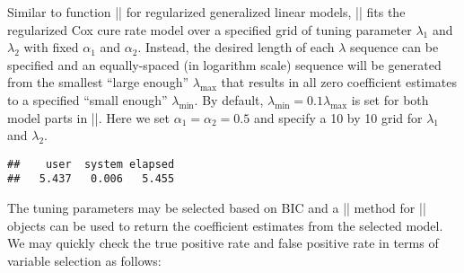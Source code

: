Similar to function
\VERB|\OperatorTok{::}\NormalTok{()}|
for regularized generalized linear models,
\VERB|\NormalTok{()}| fits the
regularized Cox cure rate model over a specified grid of tuning
parameter \(\lambda_1\) and \(\lambda_2\) with fixed \(\alpha_1\) and
\(\alpha_2\). Instead, the desired length of each \(\lambda\) sequence
can be specified and an equally-spaced (in logarithm scale) sequence
will be generated from the smallest ``large enough'' \(\lambda_{\max}\)
that results in all zero coefficient estimates to a specified ``small
enough'' \(\lambda_{\min}\). By default,
\(\lambda_{\min}=0.1\lambda_{\max}\) is set for both model parts in
\VERB|\NormalTok{()}|. Here we set
\(\alpha_1 = \alpha_2 = 0.5\) and specify a 10 by 10 grid for
\(\lambda_1\) and \(\lambda_2\).

\begin{Shaded}
\begin{Highlighting}[]
\NormalTok{(\{}
\StringTok{ }\NormalTok{(}
        \OperatorTok{$}\OperatorTok{$}
         \NormalTok{, } \NormalTok{,}
         \NormalTok{, } 
\NormalTok{    )}
\NormalTok{\})}
\end{Highlighting}
\end{Shaded}

\begin{verbatim}
##    user  system elapsed 
##   5.437   0.006   5.455
\end{verbatim}

The tuning parameters may be selected based on BIC and a
\VERB|\NormalTok{()}| method for
\VERB|| objects can be used to return the
coefficient estimates from the selected model. We may quickly check the
true positive rate and false positive rate in terms of variable
selection as follows:

